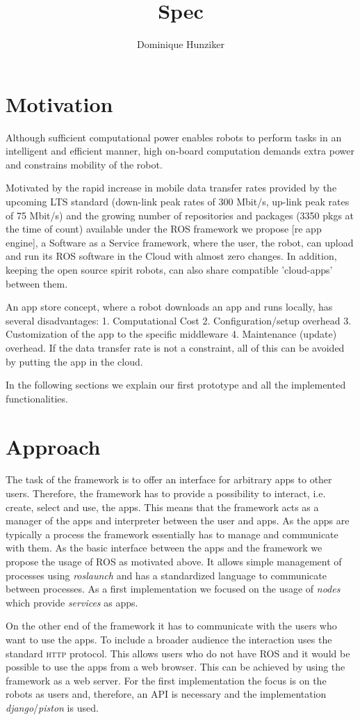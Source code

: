 \documentclass[10pt,a4paper]{article}
\title {Spec}
\author {Dominique Hunziker}
\begin{document}
	\section*{Motivation}
		Although sufficient computational power enables robots to perform
		tasks in an intelligent and efficient manner, high on-board
		computation demands extra power and constrains mobility of the robot.
		
		Motivated by the rapid increase in mobile data transfer rates provided
		by the upcoming LTS standard (down-link peak rates of 300 Mbit/s,
		up-link peak rates of 75 Mbit/s) and the growing number of
		repositories and packages (3350 pkgs at the time of count) available
		under the ROS framework we propose [re app engine], a Software as a
		Service framework, where the user, the robot, can upload and run its
		ROS software in the Cloud with almost zero changes. In addition,
		keeping the open source spirit robots, can also share compatible
		'cloud-apps' between them.
		
		An app store concept, where a robot downloads an app and runs locally,
		has several disadvantages: 1. Computational Cost 2.
		Configuration/setup overhead 3. Customization of the app to the
		specific middleware 4. Maintenance (update) overhead. If the data
		transfer rate is not a constraint, all of this can be avoided by
		putting the app in the cloud.
		
		In the following sections we explain our first prototype and all the
		implemented functionalities.
	
	\section*{Approach}
		The task of the framework is to offer an interface for arbitrary apps to other users.
		Therefore, the framework has to provide a possibility to interact, i.e. create, select and
		use, the apps. This means that the framework acts as a manager of the apps and interpreter
		between the user and apps. As the apps are typically a process the framework essentially
		has to manage and communicate with them. As the basic interface between the apps and the
		framework we propose the usage of \textsc{ROS} as motivated above. It allows simple management
		of processes using \emph{roslaunch} and has a standardized language to communicate between
		processes. As a first implementation we focused on the usage of \emph{nodes} which provide
		\emph{services} as apps.
		
		On the other end of the framework it has to communicate with the users who want to use the
		apps. To include a broader audience the interaction uses the standard \textsc{http} protocol.
		This allows users who do not have \textsc{ROS} and it would be possible to use the apps from
		a web browser. This can be achieved by using the framework as a web server. For the first
		implementation the focus is on the robots as users and, therefore, an API is necessary and
		the implementation \emph{django}/\emph{piston} is used.
	
\end{document}
